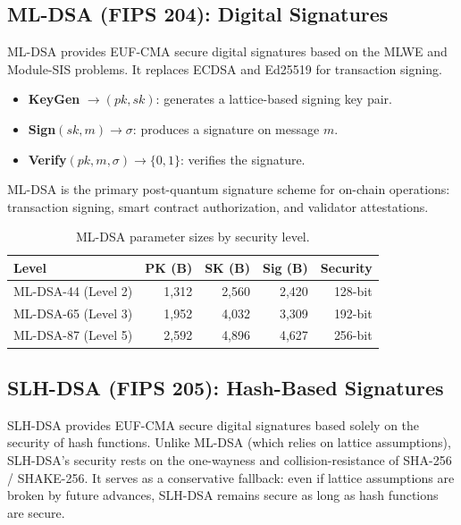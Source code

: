 \subsection{ML-DSA (FIPS 204): Digital Signatures}

\begin{definition}
ML-DSA provides EUF-CMA secure digital signatures based on the MLWE
and Module-SIS problems.  It replaces ECDSA and Ed25519 for transaction
signing.

\begin{itemize}[nosep]
  \item \textbf{KeyGen} $\rightarrow (pk, sk)$: generates a lattice-based
        signing key pair.
  \item \textbf{Sign}$(sk, m) \rightarrow \sigma$: produces a signature
        on message $m$.
  \item \textbf{Verify}$(pk, m, \sigma) \rightarrow \{0, 1\}$: verifies
        the signature.
\end{itemize}
\end{definition}

ML-DSA is the primary post-quantum signature scheme for on-chain
operations: transaction signing, smart contract authorization, and
validator attestations.

\begin{table}[h]
\centering
\begin{tabular}{lrrrr}
\toprule
\textbf{Level} & \textbf{PK (B)} & \textbf{SK (B)} &
\textbf{Sig (B)} & \textbf{Security} \\
\midrule
ML-DSA-44 (Level 2) & 1,312  & 2,560  & 2,420  & 128-bit \\
ML-DSA-65 (Level 3) & 1,952  & 4,032  & 3,309  & 192-bit \\
ML-DSA-87 (Level 5) & 2,592  & 4,896  & 4,627  & 256-bit \\
\bottomrule
\end{tabular}
\caption{ML-DSA parameter sizes by security level.}
\label{tab:mldsa-sizes}
\end{table}

\subsection{SLH-DSA (FIPS 205): Hash-Based Signatures}

\begin{definition}
SLH-DSA provides EUF-CMA secure digital signatures based solely on the
security of hash functions.  Unlike ML-DSA (which relies on lattice
assumptions), SLH-DSA's security rests on the one-wayness and
collision-resistance of SHA-256 / SHAKE-256.  It serves as a
conservative fallback: even if lattice assumptions are broken by
future advances, SLH-DSA remains secure as long as hash functions
are secure.
\end{definition}

